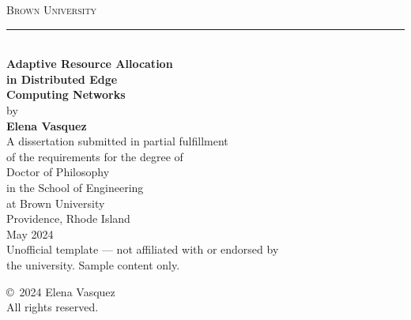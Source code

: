 \documentclass[12pt,oneside]{report}
\begin{document}
\begin{titlepage}
\centering
\vspace*{2.5cm}

{\LARGE\scshape\color{brown} Brown University}\\[0.5cm]

{\color{brown}\rule{0.6\textwidth}{1.2pt}}\\[1.5cm]

{\Huge\bfseries Adaptive Resource Allocation}\\[0.3cm]
{\Huge\bfseries in Distributed Edge}\\[0.3cm]
{\Huge\bfseries Computing Networks}\\[2cm]

{\Large by}\\[0.5cm]

{\Large\bfseries Elena Vasquez}\\[2.5cm]

{\large A dissertation submitted in partial fulfillment}\\[0.2cm]
{\large of the requirements for the degree of}\\[0.2cm]
{\large Doctor of Philosophy}\\[0.2cm]
{\large in the School of Engineering}\\[0.2cm]
{\large at Brown University}\\[1.5cm]

{\large Providence, Rhode Island}\\[0.2cm]
{\large May 2024}\\[3cm]

{\footnotesize\color{darkgray} Unofficial template --- not affiliated with or endorsed by\\the university. Sample content only.}

\end{titlepage}

\clearpage

\thispagestyle{empty}
\vspace*{6pt}
\begin{center}
\Large\color{darkgray}
\copyright\ 2024 Elena Vasquez\\[0.2cm]
All rights reserved.
\end{center}

\vspace{1.5cm}







\end{document}
